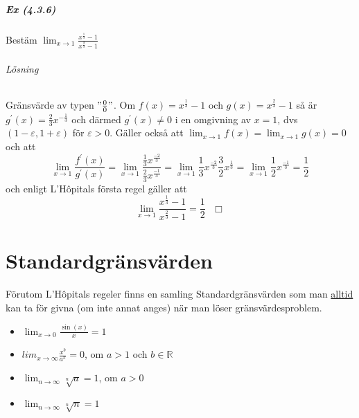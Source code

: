 \paragraph{Ex (4.3.6)} Bestäm $\lim_{x\to 1}\frac{x^\frac{1}{3}-1}{x^\frac{2}{3}-1}$
\subparagraph{Lösning} Gränsvärde av typen $"\frac{0}{0}"$.
Om $f(x)=x^\frac{1}{3}-1$ och $g(x)=x^\frac{2}{3}-1$ så är $g^\prime(x)=\frac{2}{3}x^{-\frac{1}{3}}$ och därmed $g^\prime(x)\neq 0$ i en omgivning av $x=1$,
dvs $(1-\varepsilon,1+\varepsilon)$ för $\varepsilon>0$.
Gäller också att $\lim_{x\to 1}f(x)=\lim_{x\to 1}g(x)=0$ och att
\begin{equation*}
    \lim_{x\to 1}\frac{f^\prime(x)}{g^\prime(x)}=\lim_{x\to 1}\frac{\frac{1}{3}x^\frac{-2}{3}}{\frac{2}{3}x^\frac{-1}{3}}=\lim_{x\to 1}\frac{1}{3}x^\frac{-2}{3}\frac{3}{2}x^\frac{1}{3}=\lim_{x\to 1}\frac{1}{2}x^\frac{-1}{3}=\frac{1}{2}
\end{equation*}
och enligt L'Hôpitals första regel gäller att
\begin{equation*}
    \lim_{x\to 1}\frac{x^\frac{1}{3}-1}{x^\frac{2}{3}-1}=\frac{1}{2}\text{ }\Box
\end{equation*}

\chapter{Standardgränsvärden}
Förutom L'Hôpitals regeler finns en samling Standardgränsvärden som man
\underline{alltid} kan ta för givna (om inte annat anges) när man löser gränsvärdesproblem.
\begin{itemize}
    \item $\lim_{x\to 0}\frac{\sin(x)}{x}=1$
    \item $lim_{x\to \infty}\frac{x^b}{a^x}=0$, om $a>1$ och $b\in\mathbb{R}$
    \item $\lim_{n\to \infty} \sqrt[n]{a}=1$, om $a>0$
    \item $\lim_{n\to \infty} \sqrt[n]{n}=1$
\end{itemize}